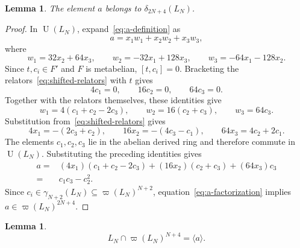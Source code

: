 \documentclass[a4paper,11pt,reqno]{amsart}
\newtheorem{lemma}[theorem]{Lemma}
\theoremstyle{definition}
\newcommand{\U}{\operatorname U}
\begin{document}
\begin{lemma}\label{lem:a-height}
The element $a$ belongs to $\delta_{2N+4}(L_N)$.
\end{lemma}

\begin{proof}
In $\U(L_N)$, expand~\eqref{eq:a-definition} as
\[
 a=x_1w_1+x_2w_2+x_3w_3,
\]
where
\[
 w_1=32x_2+64x_3,
 \qquad
 w_2=-32x_1+128x_3,
 \qquad
 w_3=-64x_1-128x_2.
\]
Since $t,c_i\in F'$ and $F$ is metabelian, $[t,c_i]=0$.  Bracketing the
relators~\eqref{eq:shifted-relators} with $t$ gives
\[
 4c_1=0,
 \qquad
 16c_2=0,
 \qquad
 64c_3=0.
\]
Together with the relators themselves, these identities give
\[
 w_1=4(c_1+c_2-2c_3),
 \qquad
 w_2=16(c_2+c_3),
 \qquad
 w_3=64c_3.
\]
Substitution from~\eqref{eq:shifted-relators} gives
\[
 4x_1=-(2c_3+c_2),
 \qquad
 16x_2=-(4c_3-c_1),
 \qquad
 64x_3=4c_2+2c_1.
\]
The elements $c_1,c_2,c_3$ lie in the abelian derived ring and therefore
commute in $\U(L_N)$.  Substituting the preceding identities gives
\begin{equation}\label{eq:a-factorization}
 \begin{aligned}
 a={}&(4x_1)(c_1+c_2-2c_3)
      +(16x_2)(c_2+c_3)+(64x_3)c_3\\
   ={}&c_1c_3-c_2^2.
 \end{aligned}
\end{equation}
Since $c_i\in\gamma_{N+2}(L_N)\subseteq\varpi(L_N)^{N+2}$,
equation~\eqref{eq:a-factorization} implies
$a\in\varpi(L_N)^{2N+4}$.
\end{proof}

\begin{lemma}\label{lem:critical-normal-form}
\[
                         L_N\cap\varpi(L_N)^{N+4}=\langle a\rangle.
\]
\end{lemma}
\end{document}
